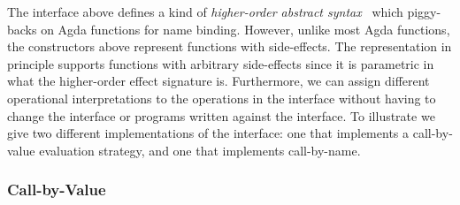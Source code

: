 The interface above defines a kind of \emph{higher-order abstract syntax}~\cite{PfenningE88} which piggy-backs on Agda functions for name binding.
However, unlike most Agda functions, the constructors above represent functions with side-effects.
The representation in principle supports functions with arbitrary side-effects since it is parametric in what  the higher-order effect signature  is.
Furthermore, we can assign different operational interpretations to the operations in the interface without having to change the interface or programs written against the interface.
To illustrate we give two different implementations of the interface: one that implements a call-by-value evaluation strategy, and one that implements call-by-name.


\subsubsection{Call-by-Value}

